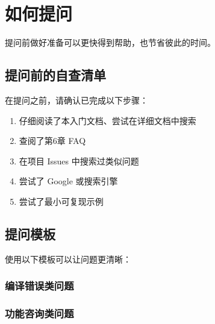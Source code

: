 
\section{如何提问}

提问前做好准备可以更快得到帮助，也节省彼此的时间。

\subsection{提问前的自查清单}

在提问之前，请确认已完成以下步骤：

\begin{enumerate}
  \item 仔细阅读了本入门文档、尝试在详细文档中搜索
  \item 查阅了第6章 FAQ
  \item 在项目 Issues 中搜索过类似问题
  \item 尝试了 Google 或搜索引擎
  \item 尝试了最小可复现示例
\end{enumerate}


\subsection{提问模板}

使用以下模板可以让问题更清晰：

\subsubsection{编译错误类问题}


\subsubsection{功能咨询类问题}

